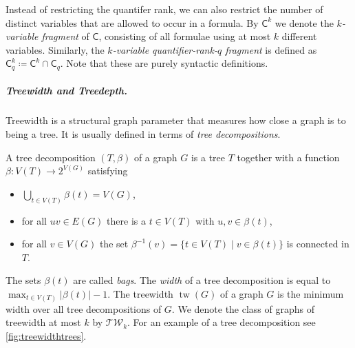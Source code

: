 \documentclass[a4paper,UKenglish,cleveref, autoref, thm-restate]{lipics-v2021}
\newcommand{\TW}{\ensuremath{\mathcal{TW}}}
\newcommand{\lC} {\ensuremath{\mathsf C}}
\DeclareMathOperator{\tw}{tw}
\begin{document}
Instead of restricting the quantifer rank, we can also restrict the number of distinct variables that are allowed to occur in a formula. By $\lC^k$ we denote the \emph{$k$-variable fragment} of $\lC$, consisting of all formulae using at most $k$ different variables. Similarly, the \emph{$k$-variable quantifier-rank-$q$ fragment} is defined as $\lC^k_q \coloneqq \lC^k \cap \lC_q$. Note that these are purely syntactic definitions.

\subparagraph{Treewidth and Treedepth.}
Treewidth is a structural graph parameter that measures how close a graph is to being a tree. It is usually defined in terms of \emph{tree decompositions}.
\begin{definition}\label{def:treedecomp}
  A tree decomposition $(T, \beta)$ of a graph $G$ is a tree $T$ together with a function $\beta \colon V(T) \to 2^{V(G)}$ satisfying
  \begin{itemize}
  \item $\bigcup_{t \in V(T)} \beta(t) = V(G)$,
  \item for all $uv \in E(G)$ there is a $t \in V(T)$ with $u, v \in \beta(t)$,
  \item for all $v \in V(G)$ the set $\beta^{-1}(v) = \{t \in V(T) \mid v \in \beta(t)  \}$ is connected in $T$.
  \end{itemize}
\end{definition}

The sets $\beta(t)$ are called \emph{bags}. The \emph{width} of a tree decomposition is equal to $\max_{t \in V(T)}|\beta(t)|-1$. The treewidth $\tw(G)$ of a graph $G$ is the minimum width over all tree decompositions of $G$. We denote the class of graphs of treewidth at most $k$ by $\TW_k$. For an example of a tree decomposition see \cref{fig:treewidthtrees}.
\end{document}
